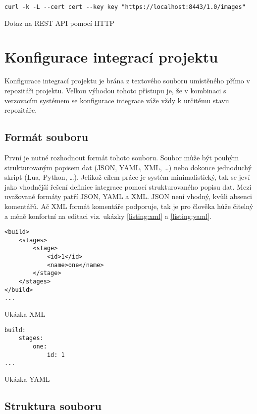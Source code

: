 \begin{listing}[ht]
\begin{verbatim}
curl -k -L --cert cert --key key "https://localhost:8443/1.0/images"
\end{verbatim}
\caption{Dotaz na REST API pomocí HTTP}
\end{listing}

\section{Konfigurace integrací projektu}

Konfigurace integrací projektu je brána z textového souboru umístěného přímo v repozitáři projektu.
Velkou výhodou tohoto přístupu je, že v kombinaci s verzovacím systémem se konfigurace integrace váže vždy k určitému stavu repozitáře.

\subsection{Formát souboru}

První je nutné rozhodnout formát tohoto souboru.
Soubor může být pouhým strukturovaným popisem dat (JSON, YAML, XML, \ldots) nebo dokonce jednoduchý skript (Lua, Python, \ldots).
Jelikož cílem práce je systém minimalistický, tak se jeví jako vhodnější řešení definice integrace pomocí strukturovaného popisu dat.
Mezi uvažované formáty patří JSON, YAML a XML.
JSON není vhodný, kvůli absenci komentářů.
Ač XML formát komentáře podporuje, tak je pro člověka hůže čitelný a méně konfortní na editaci viz. ukázky \ref{listing:xml} a \ref{listing:yaml}.

\begin{listing}[ht]
\begin{verbatim}
<build>
    <stages>
        <stage>
            <id>1</id>
            <name>one</name>
        </stage>
    </stages>
</build>
...
\end{verbatim}
\caption{Ukázka XML}
\label{listing:xml}
\end{listing}

\begin{listing}[ht]
\begin{verbatim}
build:
    stages:
        one:
            id: 1
...
\end{verbatim}
\caption{Ukázka YAML}
\label{listing:yaml}
\end{listing}

\subsection{Struktura souboru}

